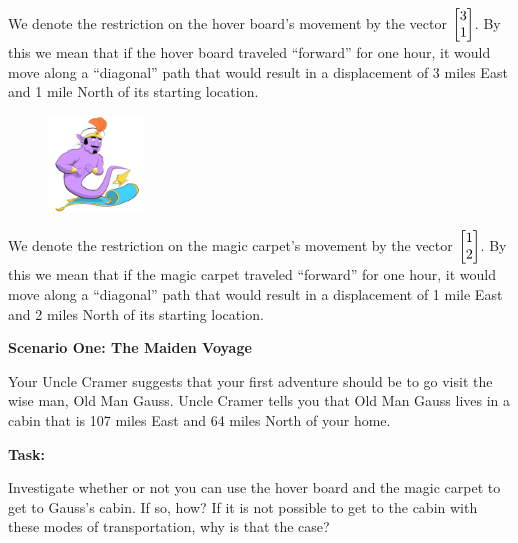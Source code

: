 \documentclass{problemset}
\begin{document}
\begin{iola}
\begin{minipage}{\textwidth}
	We denote the restriction on the hover board's movement by the vector
	$\mat{3 \\1}$. By this we mean that if
	the hover board traveled ``forward'' for one hour, it would move along a
	``diagonal'' path that would result in a displacement of 3 miles East and
	1 mile North of its starting location.
\end{minipage}

\begin{minipage}{\textwidth}
	\vspace{.5cm}
	\begin{figure}
	\vspace{-.8cm}
	\includegraphics[width=1in]{images/MagicCarpet-small.png}
	\end{figure}

	We denote the restriction on the magic carpet's movement by the vector
	$\mat{1 \\2 }$. By this we mean that if the
	magic carpet traveled ``forward'' for one hour, it would move along a
	``diagonal'' path that would result in a displacement of 1 mile East and
	2 miles North of its starting location.
\end{minipage}


\vspace{10mm}

\textbf{Scenario One: The Maiden Voyage}

Your Uncle Cramer suggests that your first adventure should be to go visit
the wise man, Old Man Gauss. Uncle Cramer tells you that Old Man Gauss
lives in a cabin that is 107 miles East and 64 miles North of your home.

\vspace{5mm}

\textbf{Task:}
\par
Investigate whether or not you can use the hover board and the magic
carpet to get to Gauss's cabin. If so, how? If it is not possible to
get to the cabin with these modes of transportation, why is that the case?

\end{iola}
\end{document}
